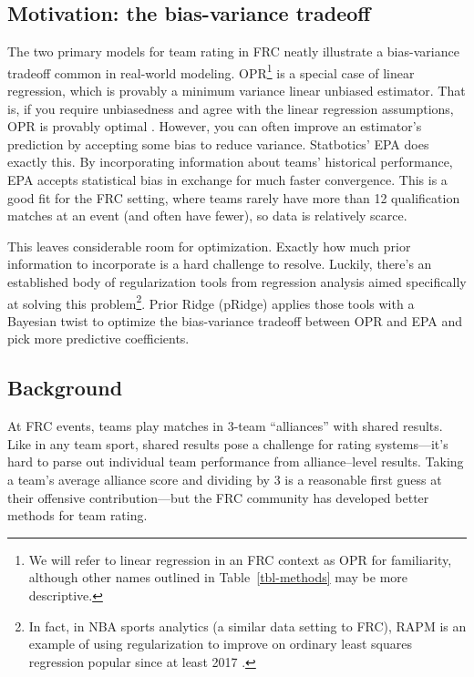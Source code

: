 \documentclass[
  12pt]{article}
\begin{document}
\subsection{Motivation: the bias-variance
tradeoff}\label{motivation-the-bias-variance-tradeoff}

The two primary models for team rating in FRC neatly illustrate a
bias-variance tradeoff common in real-world modeling. OPR\footnote{We
  will refer to linear regression in an FRC context as OPR for
  familiarity, although other names outlined in Table~\ref{tbl-methods}
  may be more descriptive.} is a special case of linear regression,
which is provably a minimum variance linear unbiased estimator. That is,
if you require unbiasedness and agree with the linear regression
assumptions, OPR is provably optimal \citep{gauss_markov}. However, you
can often improve an estimator's prediction by accepting some bias to
reduce variance. Statbotics' EPA \citep{statbotics_eval} does exactly
this. By incorporating information about teams' historical performance,
EPA accepts statistical bias in exchange for much faster convergence.
This is a good fit for the FRC setting, where teams rarely have more
than 12 qualification matches at an event (and often have fewer), so
data is relatively scarce.

This leaves considerable room for optimization. Exactly how much prior
information to incorporate is a hard challenge to resolve. Luckily,
there's an established body of regularization tools from regression
analysis aimed specifically at solving this problem\footnote{In fact, in
  NBA sports analytics (a similar data setting to FRC), RAPM
  \citep{rapm_cmu} is an example of using regularization to improve on
  ordinary least squares regression popular since at least 2017
  \citep{rapm_blog}.}. Prior Ridge (pRidge) applies those tools with a
Bayesian twist to optimize the bias-variance tradeoff between OPR and
EPA and pick more predictive coefficients.

\subsection{Background}\label{background}

At FRC events, teams play matches in 3-team ``alliances'' with shared
results. Like in any team sport, shared results pose a challenge for
rating systems---it's hard to parse out individual team performance from
alliance--level results. Taking a team's average alliance score and
dividing by 3 is a reasonable first guess at their offensive
contribution---but the FRC community has developed better methods for
team rating.
\end{document}
